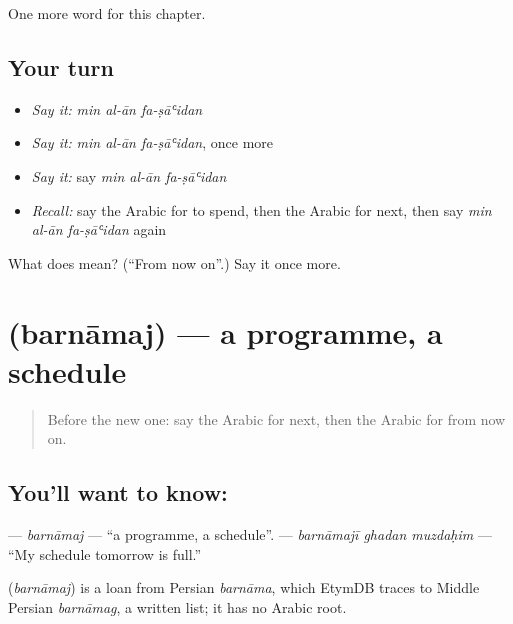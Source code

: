 \begin{grammarlens}[title={What you've built}]
One more word for this chapter.
\end{grammarlens}

\subsection*{Your turn}
\begin{itemize}
\raggedright
  \item \emph{Say it:} \emph{min al-ān fa-ṣāʿidan}
  \item \emph{Say it:} \emph{min al-ān fa-ṣāʿidan}, once more
  \item \emph{Say it:} say \emph{min al-ān fa-ṣāʿidan}
  \item \emph{Recall:} say the Arabic for to spend, then the Arabic for next, then say \emph{min al-ān fa-ṣāʿidan} again
\end{itemize}

\begin{tcolorbox}[breakable,colback=teal!4,colframe=teal!35!black,title={Before you move on}]
What does    mean? (\textquotedblleft{}From now on\textquotedblright{}.) Say it once more.
\end{tcolorbox}
\section[\texorpdfstring{\ar{برنامج} (barnāmaj)}{برنامج (barnāmaj)}]{ (barnāmaj) — a programme, a schedule}

\label{lesson:AR-C157-barnamaj}



\begin{quote}
Before the new one: say the Arabic for next, then the Arabic for from now on.
\end{quote}

\subsection*{You'll want to know: }
\textbf{} — \emph{barnāmaj} — \textquotedblleft{}a programme, a schedule\textquotedblright{}. \textbf{  } — \emph{barnāmajī ghadan muzdaḥim} — \textquotedblleft{}My schedule tomorrow is full.\textquotedblright{}

\begin{cousinweb}
\textbf{} (\emph{barnāmaj}) is a loan from Persian \emph{barnāma}, which EtymDB traces to Middle Persian \emph{barnāmag}, a written list; it has no Arabic root.
\end{cousinweb}

